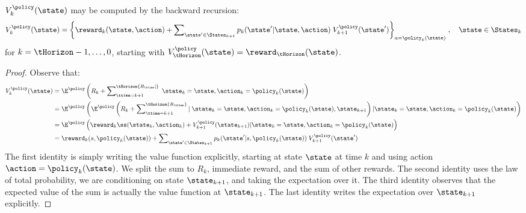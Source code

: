 \begin{lemma}\label{lem:finite_horizon_VI} $V_k^\policy (\state)$ may be computed by the backward recursion:
\[V_k^\policy (\state) = {\left\{ {{\reward_k}(\state,\action) + \sum\nolimits_{\state' \in {\States_{k + 1}}} {{p_k}(\state'|\state,\action)} \;V_{k + 1}^\policy (\state')} \right\}_{a = {\policy _k}(\state)}}\;,\quad \state \in {\States_k}\]
for $k = \tHorizon -1, \ldots ,0$,  starting with
$V_\tHorizon^\policy (\state) = {\reward_\tHorizon}(\state)$.
\end{lemma}
\begin{proof}
Observe that:
\begin{align*}
V_k^\policy (\state) &= {\E^\policy }\left( {{R_k} + \sum\nolimits_{\ttime = k + 1}^\tHorizon {{R_\ttime}|} \;{\state_k} = \state,{\action_k} = {\policy _k}(\state)} \right)\\
 &= {\E^\policy }\left( {{\E^\policy }\left( {{R_k} + \sum\nolimits_{\ttime = k + 1}^\tHorizon {{R_\ttime}} |\;{\state_k} = \state,{\action_k} = {\policy _k}(\state),{\state_{k + 1}}} \right)|{\state_k} = \state,{\action_k} = {\policy _k}(\state)} \right)\\
 &= {\E^\policy }\left( {\reward_kß({\state_k},{\action_k}) + V_{k + 1}^\policy ({\state_{k + 1}})|{\state_k} = \state,{\action_k} = {\policy _k}(\state)} \right)\\
 &= {\reward_k}(s,{\policy _k}(\state)) + \sum\nolimits_{\state' \in {\States_{k + 1}}} {{p_k}(\state'|s,{\policy _k}(\state))} \;V_{k + 1}^\policy (\state')
\end{align*}
The first identity is simply writing the value function explicitly,
starting at state $\state$ at time $k$ and using action
$\action=\policy_k(\state)$.  We split the sum to $R_k$, immediate
reward, and the sum of other rewards.
The second identity uses the law of total probability, we are
conditioning on state $\state_{k+1}$, and taking the expectation
over it.
%
The third identity observes that the expected value of the sum is actually the value function at $\state_{k+1}$. The last identity writes the expectation over $\state_{k+1}$ explicitly.
\end{proof}

